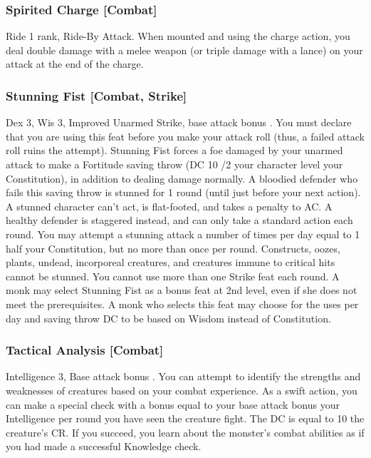 \subsubsection{Spirited Charge [Combat]}
 Ride 1 rank, Ride-By Attack.
 When mounted and using the charge action, you deal double damage with a melee weapon (or triple damage with a lance) on your attack at the end of the charge.%

\subsubsection{Stunning Fist [Combat, Strike]}
 Dex 3, Wis 3, Improved Unarmed Strike, base attack bonus .
 You must declare that you are using this feat before you make your attack roll (thus, a failed attack roll ruins the attempt). Stunning Fist forces a foe damaged by your unarmed attack to make a Fortitude saving throw (DC 10 /2 your character level \add your Constitution), in addition to dealing damage normally. A bloodied defender who fails this saving throw is stunned for 1 round (until just before your next action). A stunned character can't act, is flat-footed, and takes a  penalty to AC. A healthy defender is staggered instead, and can only take a standard action each round. You may attempt a stunning attack a number of times per day equal to 1 \add half your Constitution, but no more than once per round. Constructs, oozes, plants, undead, incorporeal creatures, and creatures immune to critical hits cannot be stunned. You cannot use more than one Strike feat each round.
 A monk may select Stunning Fist as a bonus feat at 2nd level, even if she does not meet the prerequisites. A monk who selects this feat may choose for the uses per day and saving throw DC to be based on Wisdom instead of Constitution.

\subsubsection{Tactical Analysis [Combat]}
 Intelligence 3, Base attack bonus .
 You can attempt to identify the strengths and weaknesses of creatures based on your combat experience. As a swift action, you can make a special check with a bonus equal to your base attack bonus \add your Intelligence  per round you have seen the creature fight. The DC is equal to 10 \add the creature's CR. If you succeed, you learn about the monster's combat abilities as if you had made a successful Knowledge check.

